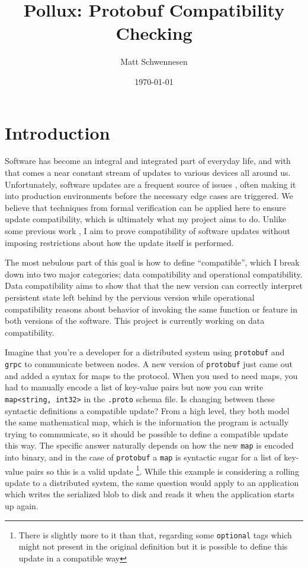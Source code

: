 \documentclass[11pt]{article}
\author{Matt Schwennesen}
\date{\today}
\title{Pollux: Protobuf Compatibility Checking}
\begin{document}
\maketitle
\tableofcontents

\section{Introduction}

Software has become an integral and integrated part of everyday life, and with
that comes a near constant stream of updates to various devices all around
us. Unfortunately, software updates are a frequent source of issues
\autocites{zhangUnderstandingDetectingSoftware2021}[][]{Gray1986WhyDC}, often
making it into production environments before the necessary edge cases are
triggered. We believe that techniques from formal verification can be applied
here to ensure update compatibility, which is ultimately what my project aims to
do. Unlike some previous work
\autocites{ajmaniModularSoftwareUpgrades2006}[][]{reitblattAbstractionsNetworkUpdate2012},
I aim to prove compatibility of software updates without imposing restrictions
about how the update itself is performed.

The most nebulous part of this goal is how to define ``compatible'', which I
break down into two major categories; data compatibility and operational
compatibility. Data compatibility aims to show that that the new version can
correctly interpret persistent state left behind by the pervious version while
operational compatibility reasons about behavior of invoking the same function
or feature in both versions of the software. This project is currently working
on data compatibility.

Imagine that you're a developer for a distributed system using \texttt{protobuf}
and \texttt{grpc} to communicate between nodes. A new version of
\texttt{protobuf} just came out and added a syntax for maps to the
protocol. When you used to need maps, you had to manually encode a list of
key-value pairs but now you can write \texttt{map<string, int32>} in the
\texttt{.proto} schema file. Is changing between these syntactic definitions a
compatible update? From a high level, they both model the same mathematical map,
which is the information the program is actually trying to communicate, so it
should be possible to define a compatible update this way. The specific answer
naturally depends on how the new \texttt{map} is encoded into binary, and in the
case of \texttt{protobuf} a \texttt{map} is syntactic sugar for a list of
key-value pairs so this is a valid update \footnote{There is slightly more to it
	than that, regarding some \texttt{optional} tags which might not present in
	the original definition but it is possible to define this update in a
	compatible way}. While this example is considering a rolling update to a
distributed system, the same question would apply to an application which writes
the serialized blob to disk and reads it when the application starts up again.
\end{document}
